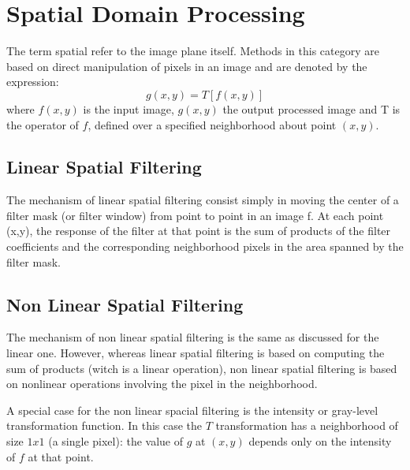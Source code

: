 \section{Spatial Domain Processing}
The term spatial refer to the image plane itself. Methods in this category are based on direct manipulation of pixels in an image and are denoted by the expression:
\begin{equation}
	g(x,y) = T[f(x,y)]
\end{equation}
where $f(x,y)$ is the input image, $g(x,y)$ the output processed image and T is the operator of $f$, defined over a specified neighborhood about point $(x,y)$.

\subsection{Linear Spatial Filtering}

The mechanism of linear spatial filtering consist simply in moving the center of a filter mask (or filter window) from point to point in an image f. At each point (x,y), the response of the filter at that point is the sum of products of the filter coefficients and the corresponding neighborhood pixels in the area spanned by the filter mask. 

\subsection{Non Linear Spatial Filtering}

The mechanism of non linear spatial filtering is the same as discussed for the linear one. However, whereas linear spatial filtering is based on computing the sum of products (witch is a linear operation), non linear spatial filtering is based on nonlinear operations involving the pixel in the neighborhood.
\newline

A special case for the non linear spacial filtering is the intensity  or gray-level transformation function. In this case the $T$ transformation has a neighborhood of size $1x1$ (a single pixel): the value of $g$ at $(x,y)$ depends only on the intensity of $f$ at that point.
